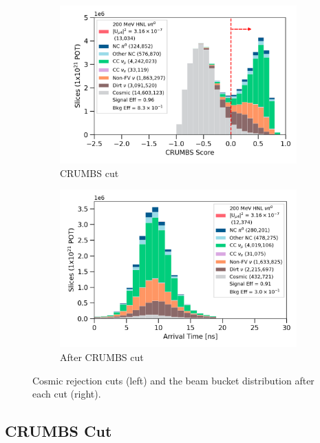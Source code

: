 \begin{figure}[hb!]
\begin{subfigure}[b]{0.495\textwidth}
            \includegraphics[width=\textwidth]{crumbs_precut}
            \caption{CRUMBS cut}%
            \label{fig:crumbs_cut}
        \end{subfigure}
        \hfill
        \begin{subfigure}[b]{0.495\textwidth}   
            \centering 
            \includegraphics[width=\textwidth]{beam_bucket_post_crumbs}
            \caption{After CRUMBS cut}%
            \label{fig:bb_crumbs}
        \end{subfigure}
        \caption{
		Cosmic rejection cuts (left) and the beam bucket distribution after each cut (right). 
	}
        \label{fig:cosmic_cut}
\end{figure}

\subsection{CRUMBS Cut}
\label{sec:cosmic_crumbs}

